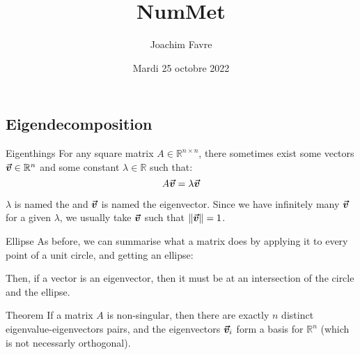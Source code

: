 \documentclass[a4paper]{article}
\title{NumMet}
\author{Joachim Favre}
\date{Mardi 25 octobre 2022}
\begin{document}
\maketitle


\subsection{Eigendecomposition}
\begin{parag}{Eigenthings}
    For any square matrix $A \in \mathbb{R}^{n \times n}$, there sometimes exist some vectors $\bm{\protect\vec{v}} \in \mathbb{R}^{n}$ and some constant $\lambda \in \mathbb{R}$ such that: 
    \[A \bm{\protect\vec{v}} = \lambda \bm{\protect\vec{v}}\]
    
    $\lambda$ is named the  and $\bm{\protect\vec{v}}$ is named the eigenvector. Since we have infinitely many $\bm{\protect\vec{v}}$ for a given $\lambda$, we usually take $\bm{\protect\vec{v}}$ such that $\left\|\bvec{v}\right\| = 1$.

    \begin{subparag}{Ellipse}
       As before, we can summarise what a matrix does by applying it to every point of a unit circle, and getting an ellipse:
        
       Then, if a vector is an eigenvector, then it must be at an intersection of the circle and the ellipse.
    \end{subparag}
    
\end{parag}

\begin{parag}{Theorem}
    If a matrix $A$ is non-singular, then there are exactly $n$ distinct eigenvalue-eigenvectors pairs, and the eigenvectors $\bm{\protect\vec{v}}_i$ form a basis for $\mathbb{R}^n$ (which is not necessarly orthogonal).
\end{parag}
\end{document}
